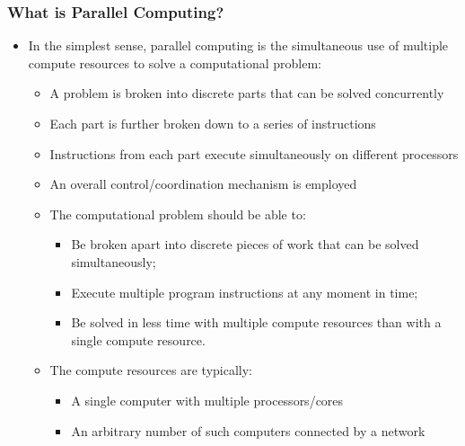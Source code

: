\documentclass[10pt,t]{beamer}
\begin{document}
\begin{frame}
  \frametitle{What is Parallel Computing?}
  \begin{itemize}
  \item In the simplest sense, parallel computing is the simultaneous use of multiple compute resources to solve a computational problem:
    \begin{itemize}
    \item A problem is broken into discrete parts that can be solved concurrently
    \item Each part is further broken down to a series of instructions
    \item Instructions from each part execute simultaneously on different processors
    \item An overall control/coordination mechanism is employed
    \item The computational problem should be able to:
      \begin{itemize}
      \item Be broken apart into discrete pieces of work that can be solved simultaneously;
      \item Execute multiple program instructions at any moment in time;
      \item Be solved in less time with multiple compute resources than with a single compute resource.
      \end{itemize}
    \item The compute resources are typically:
      \begin{itemize}
      \item A single computer with multiple processors/cores
      \item An arbitrary number of such computers connected by a network
      \end{itemize}
    \end{itemize}
  \end{itemize}
\end{frame}
\end{document}
